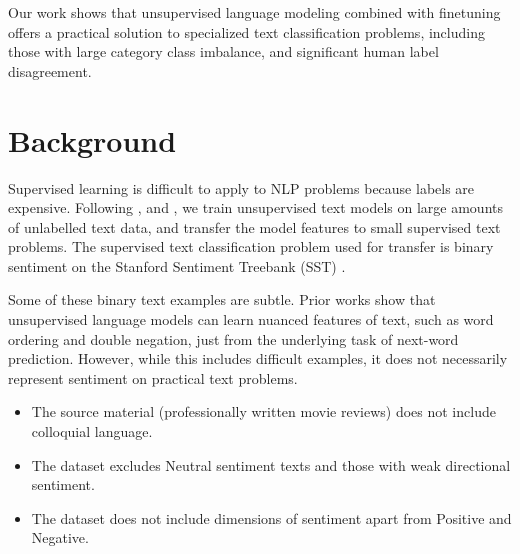 \documentclass[letterpaper]{article} \usepackage{aaai19}  \usepackage{times}  \usepackage{helvet}  \usepackage{courier}  \usepackage{url}  \usepackage{graphicx}  \usepackage{booktabs}
\begin{document}
Our work shows that unsupervised language modeling combined with finetuning offers a practical solution to specialized text classification problems, including those with large category class imbalance, and significant human label disagreement. 




\section{Background}
Supervised learning is difficult to apply to NLP problems because labels are expensive. Following \protect\cite{Radford2017}, \protect\cite{Radford2018} and \protect\cite{Dai2015}, we train unsupervised text models on large amounts of unlabelled text data, and transfer the model features to small supervised text problems. The supervised text classification problem used for transfer is binary sentiment on the Stanford Sentiment Treebank (SST) \protect\cite{SST-Socher:2013}.


Some of these binary text examples are subtle. Prior works show that unsupervised language models can learn nuanced features of text, such as word ordering and double negation, just from the underlying task of next-word prediction. However, while this includes difficult examples, it does not necessarily represent sentiment on practical text problems.
\begin{itemize}
\itemsep0em
    \item The source material (professionally written movie reviews) does not include colloquial language.
    \item The dataset excludes Neutral sentiment texts and those with weak directional sentiment.
    \item The dataset does not include dimensions of sentiment apart from Positive and Negative.
\end{itemize}
\end{document}

